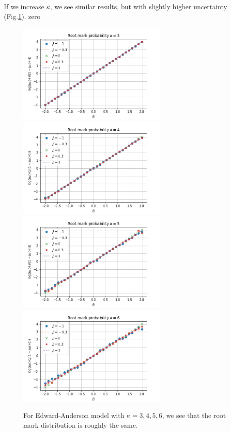 \documentclass[12pt]{article}
\numberwithin{equation}{section}
\begin{document}
If we increase $\kappa$, we see similar results, but with slightly higher uncertainty (Fig.\ref{Fig.EA-x0-B-logisitic-change-kappa}).
zero
\begin{figure}[h]
    \centering
    \includegraphics[width=7.5cm]{img/EA_x0_B_logisitic_kappa_3.png}
    \includegraphics[width=7.5cm]{img/EA_x0_B_logisitic_kappa_4.png}
    \includegraphics[width=7.5cm]{img/EA_x0_B_logisitic_kappa_5.png}
    \includegraphics[width=7.5cm]{img/EA_x0_B_logisitic_kappa_6.png}
    \caption{For Edward-Anderson model with $\kappa=3, 4, 5, 6$, we see that the root mark distribution is roughly the same. }
    \label{Fig.EA-x0-B-logisitic-change-kappa}
\end{figure}
\end{document}

